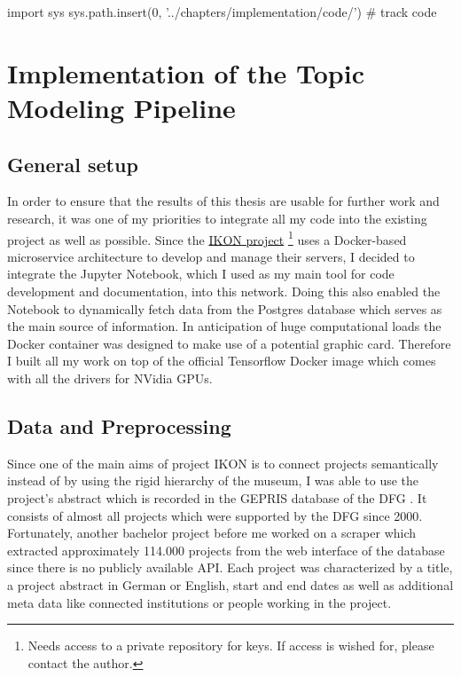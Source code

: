 % 
\begin{pycode}
import sys
sys.path.insert(0, '../chapters/implementation/code/')
# track code

\end{pycode}

\chapter{Implementation of the Topic Modeling Pipeline}
\label{chap:topic_modeling}

\section{General setup}

In order to ensure that the results of this thesis are usable for further work and research, it was one of my priorities to integrate all my code into the existing project as well as possible. Since the \href{https://github.com/FUB-HCC/IKON-backend}{IKON project} \footnote{Needs access to a private repository for keys. If access is wished for, please contact the author.} uses a Docker-based microservice architecture to develop and manage their servers, I decided to integrate the Jupyter Notebook, which I used as my main tool for code development and documentation, into this network. Doing this also enabled the Notebook to dynamically fetch data from the Postgres database which serves as the main source of information.
In anticipation of huge computational loads the Docker container was designed to make use of a potential graphic card. Therefore I built all my work on top of the official Tensorflow Docker image which comes with all the drivers for NVidia GPUs.
\section{Data and Preprocessing}
Since one of the main aims of project IKON is to connect projects semantically instead of by using the rigid hierarchy of the museum, I was able to use the project's abstract which is recorded in the GEPRIS database of the DFG \cite{DFGGEPRIS}. It consists of almost all projects which were supported by the DFG since 2000. Fortunately, another bachelor project \cite{spaudedanielImplementierungSoftwareRegelmassigen2018} before me worked on a scraper which extracted approximately 114.000 projects from the web interface of the database since there is no publicly available API. Each project was characterized by a title, a project abstract in German or English, start and end dates as well as additional meta data like connected institutions or people working in the project.

